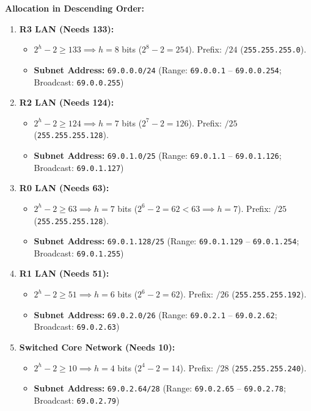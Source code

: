 \documentclass[11pt,a4paper]{article}
\begin{document}
\textbf{Allocation in Descending Order:}
\begin{enumerate}
    \item \textbf{R3 LAN (Needs 133):}
    \begin{itemize}
        \item $2^h - 2 \ge 133 \implies h = 8$ bits ($2^8 - 2 = 254$). Prefix: $/24$ (\texttt{255.255.255.0}).
        \item \textbf{Subnet Address:} \texttt{69.0.0.0/24} (Range: \texttt{69.0.0.1} -- \texttt{69.0.0.254}; Broadcast: \texttt{69.0.0.255})
    \end{itemize}
    \item \textbf{R2 LAN (Needs 124):}
    \begin{itemize}
        \item $2^h - 2 \ge 124 \implies h = 7$ bits ($2^7 - 2 = 126$). Prefix: $/25$ (\texttt{255.255.255.128}).
        \item \textbf{Subnet Address:} \texttt{69.0.1.0/25} (Range: \texttt{69.0.1.1} -- \texttt{69.0.1.126}; Broadcast: \texttt{69.0.1.127})
    \end{itemize}
    \item \textbf{R0 LAN (Needs 63):}
    \begin{itemize}
        \item $2^h - 2 \ge 63 \implies h = 7$ bits ($2^6 - 2 = 62 < 63 \implies h = 7$). Prefix: $/25$ (\texttt{255.255.255.128}).
        \item \textbf{Subnet Address:} \texttt{69.0.1.128/25} (Range: \texttt{69.0.1.129} -- \texttt{69.0.1.254}; Broadcast: \texttt{69.0.1.255})
    \end{itemize}
    \item \textbf{R1 LAN (Needs 51):}
    \begin{itemize}
        \item $2^h - 2 \ge 51 \implies h = 6$ bits ($2^6 - 2 = 62$). Prefix: $/26$ (\texttt{255.255.255.192}).
        \item \textbf{Subnet Address:} \texttt{69.0.2.0/26} (Range: \texttt{69.0.2.1} -- \texttt{69.0.2.62}; Broadcast: \texttt{69.0.2.63})
    \end{itemize}
    \item \textbf{Switched Core Network (Needs 10):}
    \begin{itemize}
        \item $2^h - 2 \ge 10 \implies h = 4$ bits ($2^4 - 2 = 14$). Prefix: $/28$ (\texttt{255.255.255.240}).
        \item \textbf{Subnet Address:} \texttt{69.0.2.64/28} (Range: \texttt{69.0.2.65} -- \texttt{69.0.2.78}; Broadcast: \texttt{69.0.2.79})
    \end{itemize}
\end{enumerate}
\end{document}
